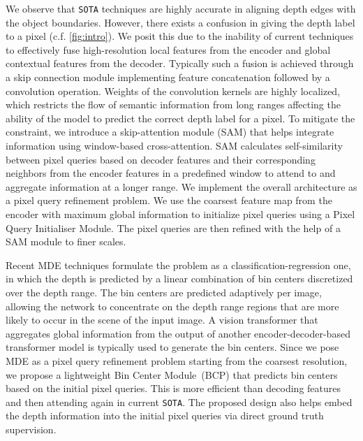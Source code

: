 \documentclass[10pt,twocolumn,letterpaper]{article}
\newcommand\SOTA{\texttt{SOTA}\xspace}
\begin{document}
We observe that \SOTA \cite{adabins, newcrf} techniques are highly accurate in aligning depth edges with the object boundaries. However, there exists a confusion in giving the depth label to a pixel (c.f. \cref{fig:intro}). We posit this due to the inability of current techniques to effectively fuse high-resolution local features from the encoder and global contextual features from the decoder. Typically such a fusion is achieved through a skip connection module implementing feature concatenation followed by a convolution operation. Weights of the convolution kernels are highly localized, which restricts the flow of semantic information from long ranges affecting the ability of the model to predict the correct depth label for a pixel. 
To mitigate the constraint, we introduce a skip-attention module (SAM) that helps integrate information using window-based cross-attention. SAM calculates self-similarity between pixel queries based on decoder features and their corresponding neighbors from the encoder features in a predefined window to attend to and aggregate information at a longer range. We implement the overall architecture as a pixel query refinement problem. We use the coarsest feature map from the encoder with maximum global information to initialize pixel queries using a Pixel Query Initialiser Module. The pixel queries are then refined with the help of a SAM module to finer scales. 

Recent MDE techniques \cite{adabins} formulate the problem as a classification-regression one, in which the depth is predicted by a linear combination of bin centers discretized over the depth range. The bin centers are predicted adaptively per image, allowing the network to concentrate on the depth range regions that are more likely to occur in the scene of the input image. A vision transformer that aggregates global information from the output of another encoder-decoder-based transformer model is typically used to generate the bin centers. Since we pose MDE as a pixel query refinement problem starting from the coarsest resolution, we propose a lightweight Bin Center Module~(BCP) that predicts bin centers based on the initial pixel queries. This is more efficient than decoding features and then attending again in current \SOTA \cite{adabins}. The proposed design also helps embed the depth information into the initial pixel queries via direct ground truth supervision.
\end{document}
